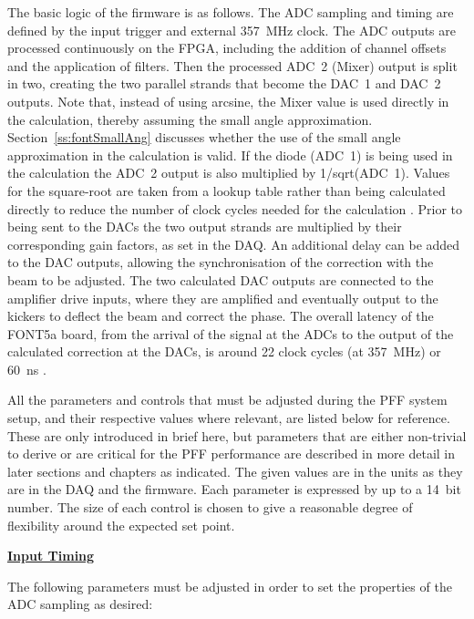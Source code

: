 The basic logic of the firmware is as follows. The ADC sampling and timing are defined by the input trigger and external 357~MHz clock. The ADC outputs are processed continuously on the FPGA, including the addition of channel offsets and the application of filters. Then the processed ADC~2 (Mixer) output is split in two, creating the two parallel strands that become the DAC~1 and DAC~2 outputs. Note that, instead of using arcsine, the Mixer value is used directly in the calculation, thereby assuming the small angle approximation. Section~\ref{ss:fontSmallAng} discusses whether the use of the small angle approximation in the calculation is valid. If the diode (ADC~1) is being used in the calculation the ADC~2 output is also multiplied by 1/sqrt(ADC~1). Values for the square-root are taken from a lookup table rather than being calculated directly to reduce the number of clock cycles needed for the calculation \cite{glennCLIC13}. Prior to being sent to the DACs the two output strands are multiplied by their corresponding gain factors, as set in the DAQ. An additional delay can be added to the DAC outputs, allowing the synchronisation of the correction with the beam to be adjusted. The two calculated DAC outputs are connected to the amplifier drive inputs, where they are amplified and eventually output to the kickers to deflect the beam and correct the phase. 
The overall latency of the FONT5a board, from the arrival of the signal at the ADCs to the output of the calculated correction at the DACs, is around 22 clock cycles (at 357~MHz) or 60~ns \cite{glennCLIC14}.


All the parameters and controls that must be adjusted during the PFF system setup, and their respective values where relevant, are listed below for reference. These are only introduced in brief here, but parameters that are either non-trivial to derive or are critical for the PFF performance are described in more detail in later sections and chapters as indicated. The given values are in the units as they are in the DAQ and the firmware. Each parameter is expressed by up to a 14~bit number. The size of each control is chosen to give a reasonable degree of flexibility around the expected set point. 

\vspace{0.2cm}
\noindent\underline{\textbf{Input Timing}}

\noindent The following parameters must be adjusted in order to set the properties of the ADC sampling as desired:

